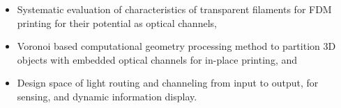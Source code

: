     \begin{itemize}[noitemsep, leftmargin=*]
        \item Systematic evaluation of characteristics of transparent filaments for FDM printing for their potential as optical channels,
        \item Voronoi based computational geometry processing method to partition 3D objects with embedded optical channels for in-place printing, and
        \item Design space of light routing and channeling from input to output, for  sensing, and dynamic information display. %

    \end{itemize}


 